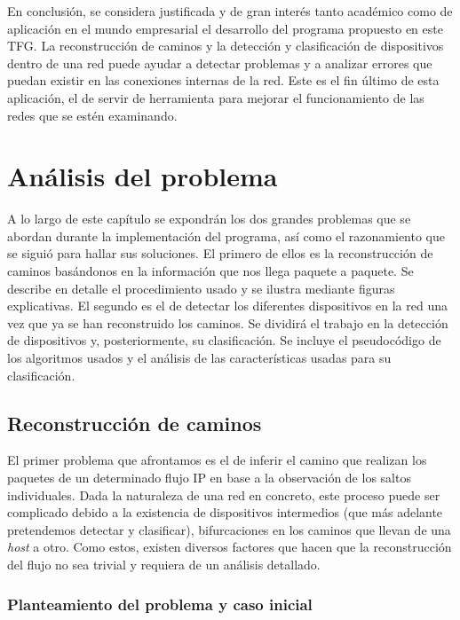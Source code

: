 \documentclass[twoside, 12pt]{epstfg}
\begin{document}
En conclusión, se considera justificada y de gran interés tanto académico como de aplicación en el mundo empresarial el desarrollo del programa propuesto en este TFG. La reconstrucción de caminos y la detección y clasificación de dispositivos dentro de una red puede ayudar a detectar problemas y a analizar errores que puedan existir en las conexiones internas de la red. Este es el fin último de esta aplicación, el de servir de herramienta para mejorar el funcionamiento de las redes que se estén examinando.


\chapter{Análisis del problema}
\label{chap:Analisis}
A lo largo de este capítulo se expondrán los dos grandes problemas que se abordan durante la implementación del programa, así como el razonamiento que se siguió para hallar sus soluciones. El primero de ellos es la reconstrucción de caminos basándonos en la información que nos llega paquete a paquete. Se describe en detalle el procedimiento usado y se ilustra mediante figuras explicativas. El segundo es el de detectar los diferentes dispositivos en la red una vez que ya se han reconstruido los caminos. Se dividirá el trabajo en la detección de dispositivos y, posteriormente, su clasificación. Se incluye el pseudocódigo de los algoritmos usados y el análisis de las características usadas para su clasificación.

\section{Reconstrucción de caminos}
El primer problema que afrontamos es el de inferir el camino que realizan los paquetes de un determinado flujo IP en base a la observación de los saltos individuales. Dada la naturaleza de una red en concreto, este proceso puede ser complicado debido a la existencia de dispositivos intermedios (que más adelante pretendemos detectar y clasificar), bifurcaciones en los caminos que llevan de una \textit{host} a otro. Como estos, existen diversos factores que hacen que la reconstrucción del flujo no sea trivial y requiera de un análisis detallado.

\subsection{Planteamiento del problema y caso inicial}
\end{document}
